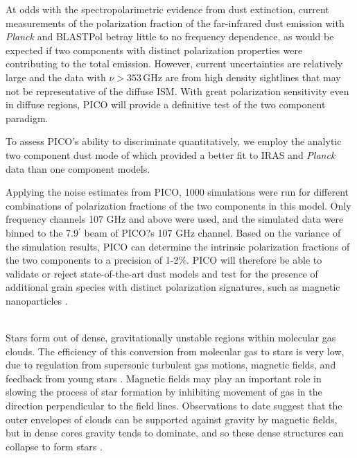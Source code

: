 \documentclass[PICOReport.tex]{subfiles}
\begin{document}
At odds with the spectropolarimetric evidence from dust extinction, current measurements of the polarization fraction of the far-infrared dust emission with {\it Planck} \citep{Planck_Int_XXII} and BLASTPol \citep{Ashton2018} betray little to no frequency dependence, as would be expected if two components with distinct polarization properties were contributing to the total emission. However, current uncertainties are relatively large and the data with $\nu > 353\,$GHz are from high density sightlines that may not be representative of the diffuse ISM. With great polarization sensitivity even in diffuse regions, PICO will provide a definitive test of the two component paradigm.

To assess PICO's ability to discriminate quantitatively, we employ the analytic two component dust mode of \cite{Meisner2015} which provided a better fit to IRAS and {\it Planck} data than one component models. 

Applying the noise estimates from PICO, 1000 simulations were run for different combinations of polarization fractions of the two components in this model. Only frequency channels 107 GHz and above were used, and the simulated data were binned to the 7.9$^\prime$ beam of PICO?s 107 GHz channel. Based on the variance of the simulation results, PICO can determine the intrinsic polarization fractions of the two components to a precision of 1-2\%. PICO will therefore be able to validate or reject state-of-the-art dust models \citep[e.g.][Hensley \& Draine, in prep]{Guillet2018} and test for the presence of additional grain species with distinct polarization signatures, such as magnetic nanoparticles \citep{Draine2013}.%
%

\vspace{0.1in}
 \\
Stars form out of dense, gravitationally unstable regions within molecular gas clouds. The efficiency of this conversion from molecular gas to stars is very low, due to regulation from supersonic turbulent gas motions, magnetic fields, and feedback from young stars \citep{McKee2007}. 
Magnetic fields may play an important role in slowing the process of star formation by inhibiting movement of gas in the direction perpendicular to the field lines.  Observations to date suggest that the outer envelopes of clouds can be supported against gravity by magnetic fields, but in dense cores gravity tends to dominate, and so these dense structures can collapse to form stars \citep{Crutcher2010}.
\end{document}
